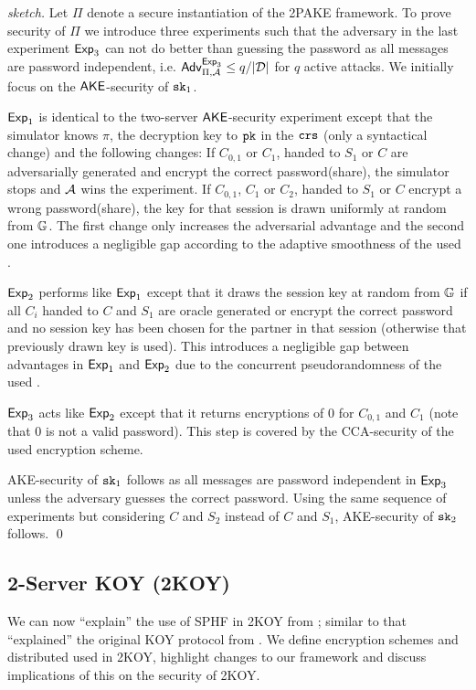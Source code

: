 \begin{proof}[sketch]
Let $\Pi$ denote a secure instantiation of the 2PAKE framework.
To prove security of $\Pi$ we introduce three experiments such that the adversary in the last experiment $\mathsf{Exp}_3$ can not do better than guessing the password as all messages are password independent, i.e. $\mathsf{Adv}_{\Pi,\mathcal{A}}^{\mathsf{Exp}_3}\leq q/|\mathcal{D}|$ for $q$ active attacks.
We initially focus on the $\mathsf{AKE}$-security of $\mathtt{sk}_1$.

$\mathsf{Exp}_1$ is identical to the two-server $\mathsf{AKE}$-security experiment except that the simulator knows $\pi$, the decryption key to $\mathtt{pk}$ in the $\mathtt{crs}$ (only a syntactical change) and the following changes:
If $C_{0,1}$ or $C_{1}$, handed to $S_1$ or $C$ are adversarially generated and encrypt the correct password(share), the simulator stops and $\mathcal{A}$ wins the experiment.
If $C_{0,1}$, $C_1$ or $C_2$, handed to $S_1$ or $C$ encrypt a wrong password(share), the key for that session is drawn uniformly at random from $\mathbb{G}$.
The first change only increases the adversarial advantage and the second one introduces a negligible gap according to the adaptive smoothness of the used \SPHFF.

$\mathsf{Exp}_2$ performs like $\mathsf{Exp}_1$ except that it draws the session key at random from $\mathbb{G}$ if all $C_i$ handed to $C$ and $S_1$ are oracle generated or encrypt the correct password and no session key has been chosen for the partner in that session (otherwise that previously drawn key is used).
This introduces a negligible gap between advantages in $\mathsf{Exp}_1$ and $\mathsf{Exp}_2$ due to the concurrent pseudorandomness of the used \SPHFF.

$\mathsf{Exp}_3$ acts like $\mathsf{Exp}_2$ except that it returns encryptions of $0$ for $C_{0,1}$ and $C_1$ (note that $0$ is not a valid password).
This step is covered by the CCA-security of the used encryption scheme.

AKE-security of $\mathtt{sk}_1$ follows as all messages are password independent in $\mathsf{Exp}_3$ unless the adversary guesses the correct password.
Using the same sequence of experiments but considering $C$ and $S_2$ instead of $C$ and $S_1$, AKE-security of $\mathtt{sk}_2$ follows.
\qed
\end{proof}

\subsection[2-Server KOY (2KOY)]{2-Server KOY (2KOY) \cite{Katz_MacKenzie_Taban_Gligor_2005}}\label{sec:twokoy}
We can  now ``explain'' the use of SPHF in 2KOY from \cite{Katz_MacKenzie_Taban_Gligor_2005}; similar to \cite{Gennaro2003} that ``explained'' the original KOY protocol from \cite{Katz_Ostrovsky_Yung_2001}.
We define encryption schemes and distributed \SPHFF used in 2KOY, highlight changes to our framework and discuss implications of this on the security of 2KOY.

